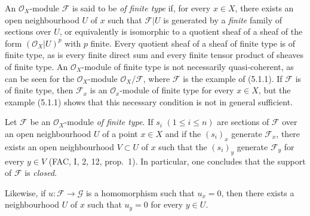 \begin{env}[5.2.1]
\label{0.5.2.1}
An $\mathcal{O}_X$-module $\mathcal{F}$ is said to be \emph{of finite type} if,
for every $x\in X$, there exists an open neighbourhood $U$ of $x$ such that
$\mathcal{F}|U$ is generated by a \emph{finite} family of sections
over $U$, or equivalently is isomorphic to a quotient sheaf of a
sheaf of the form $(\mathcal{O}_X|U)^p$ with $p$ finite. Every quotient
sheaf of a sheaf of finite type is of finite type, as is every finite direct
sum and every finite tensor product of sheaves of finite type. An
$\mathcal{O}_X$-module of finite type is not necessarily quasi-coherent,
as can be seen for the $\mathcal{O}_X$-module
$\mathcal{O}_X/\mathcal{F}$, where $\mathcal{F}$ is the example of (5.1.1). If
$\mathcal{F}$ is of finite type, then $\mathcal{F}_x$ is an
$\mathcal{O}_x$-module of finite type for every $x\in X$, but the example
(5.1.1) shows that this necessary condition is not in general
sufficient.
\end{env}

\begin{env}[5.2.2]
\label{0.5.2.2}
Let $\mathcal{F}$ be an $\mathcal{O}_X$-module \emph{of finite type}. If $s_i$
$(1\leq i\leq n)$ are sections of $\mathcal{F}$ over an open
neighbourhood $U$ of a point $x\in X$ and if the $(s_i)_x$ generate
$\mathcal{F}_x$, there exists an open neighbourhood $V\subset U$ of $x$ such that
the $(s_i)_y$ generate $\mathcal{F}_y$ for every $y\in V$ (FAC, I, 2, 12,
prop.~1). In particular, one concludes that the support of $\mathcal{F}$ is
\emph{closed}.


Likewise, if $u:\mathcal{F}\to\mathcal{G}$ is a homomorphism such that
$u_x=0$, then there exists a neighbourhood $U$ of $x$ such that $u_y=0$ for every
$y\in U$.
\end{env}

